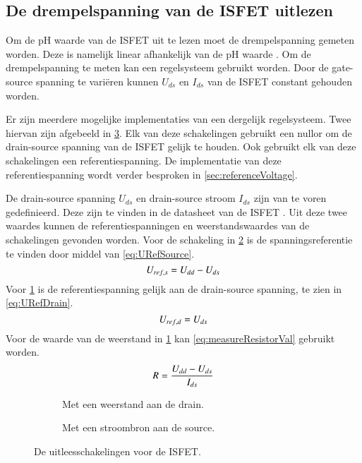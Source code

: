 \subsection{De drempelspanning van de ISFET uitlezen} \label{sec:ISFETLees}

Om de pH waarde van de ISFET uit te lezen moet de drempelspanning gemeten worden. Deze is namelijk linear afhankelijk van de pH waarde \cite{isfetAsAnElectronicDevice}.
Om de drempelspanning te meten kan een regelsysteem gebruikt worden. Door de gate-source spanning te variëren kunnen $U_{ds}$ en $I_{ds}$ van de ISFET constant gehouden worden.

Er zijn meerdere mogelijke implementaties van een dergelijk regelsysteem. Twee hiervan zijn afgebeeld in \cref{fig:measureCircuits}.
Elk van deze schakelingen gebruikt een nullor om de drain-source spanning van de ISFET gelijk te houden. Ook gebruikt elk van deze schakelingen een referentiespanning. De implementatie van deze referentiespanning wordt verder besproken in \cref{sec:referenceVoltage}.

De drain-source spanning $U_{ds}$ en drain-source stroom $I_{ds}$ zijn van te voren gedefinieerd. Deze zijn te vinden in de datasheet van de ISFET \cite{isfet}. Uit deze twee waardes kunnen de referentiespanningen en weerstandswaardes van de schakelingen gevonden worden.
Voor de schakeling in \cref{fig:measureCurrent} is de spanningsreferentie te vinden door middel van \cref{eq:URefSource}.
\begin{equation}\label{eq:URefSource}
    U_{ref,s} = U_{dd} - U_{ds}
    \tagaddtext{[\si{\volt}]}
\end{equation}
Voor \cref{fig:measureResistor} is de referentiespanning gelijk aan de drain-source spanning, te zien in \cref{eq:URefDrain}.
\begin{equation}\label{eq:URefDrain}
    U_{ref,d} = U_{ds}
    \tagaddtext{[\si{\volt}]}
\end{equation}
Voor de waarde van de weerstand in \cref{fig:measureResistor} kan \cref{eq:measureResistorVal} gebruikt worden.
\begin{equation}\label{eq:measureResistorVal}
    R = \frac{U_{dd} - U_{ds}}{I_{ds}}
    \tagaddtext{[\si{\ohm}]}
\end{equation}


\begin{figure}[!htbp]
    \centering
    \begin{subfigure}[b]{0.45\textwidth}
        \centering
        \def\svgwidth{\textwidth}
        
        \caption{Met een weerstand aan de drain.}
        \label{fig:measureResistor}
    \end{subfigure}
    \hfill
    \begin{subfigure}[b]{0.45\textwidth}
        \centering
        \def\svgwidth{\textwidth}
        
        \caption{Met een stroombron aan de source.}
        \label{fig:measureCurrent}
    \end{subfigure}
    \caption{De uitleesschakelingen voor de ISFET.}
    \label{fig:measureCircuits}
\end{figure}

